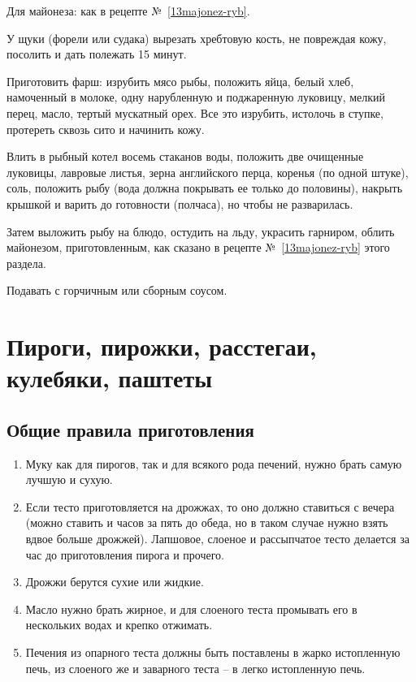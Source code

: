 Для майонеза: как в рецепте №~\ref{13majonez-ryb}.

У щуки (форели или судака) вырезать хребтовую кость, не повреждая кожу, посолить и дать полежать 15 минут.

Приготовить фарш: изрубить мясо рыбы, положить яйца, белый хлеб, намоченный в молоке, одну нарубленную и поджаренную луковицу, мелкий перец, масло, тертый мускатный орех. Все это изрубить, истолочь в ступке, протереть сквозь сито и начинить кожу.

Влить в рыбный котел восемь стаканов воды, положить две очищенные луковицы, лавровые листья, зерна английского перца, коренья (по одной штуке), соль, положить рыбу (вода должна покрывать ее только до половины), накрыть крышкой и варить до готовности (полчаса), но чтобы не разварилась.

Затем выложить рыбу на блюдо, остудить на льду, украсить гарниром, облить майонезом, приготовленным, как сказано в рецепте №~\ref{13majonez-ryb} этого раздела.

Подавать с горчичным или сборным соусом.

\newpage
\section{Пироги, пирожки, расстегаи, кулебяки, паштеты}

\subsection*{Общие правила приготовления} \label{sec:obschie-pirogi}

\begin{enumerate}
	\item Муку как для пирогов, так и для всякого рода печений, нужно брать самую лучшую и сухую.
    \item Если тесто приготовляется на дрожжах, то оно должно ставиться с вечера (можно ставить и часов за пять до обеда, но в таком случае нужно взять вдвое больше дрожжей). Лапшовое, слоеное и рассыпчатое тесто делается за час до приготовления пирога и прочего.
    \item Дрожжи берутся сухие или жидкие.
    \item Масло нужно брать жирное, и для слоеного теста промывать его в нескольких водах и крепко отжимать.
    \item Печения из опарного теста должны быть поставлены в жарко истопленную печь, из слоеного же и заварного теста – в легко истопленную печь.
\end{enumerate}


